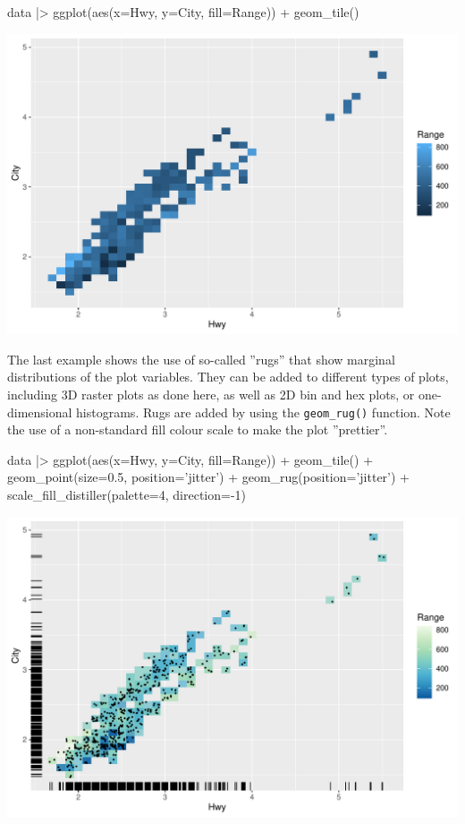 \begin{Rcode}
data |>
  ggplot(aes(x=Hwy, y=City, fill=Range)) + 
    geom_tile() 
\end{Rcode}

\begin{center}
  \includegraphics[width=.8\textwidth]{fuel.raster.pdf}
\end{center}

The last example shows the use of so-called ''rugs'' that show marginal distributions of the plot variables. They can be added to different types of plots, including 3D raster plots as done here, as well as 2D bin and hex plots, or one-dimensional histograms. Rugs are added by using the \texttt{geom\_rug()} function. Note the use of a non-standard fill colour scale to make the plot ''prettier''.

\begin{Rcode}
data |>
  ggplot(aes(x=Hwy, y=City, fill=Range)) + 
    geom_tile() + 
    geom_point(size=0.5, position='jitter') +
    geom_rug(position='jitter') + 
    scale_fill_distiller(palette=4, direction=-1)
\end{Rcode}

\begin{center}
  \includegraphics[width=.8\textwidth]{fuel.raster.rug.pdf}
\end{center}

